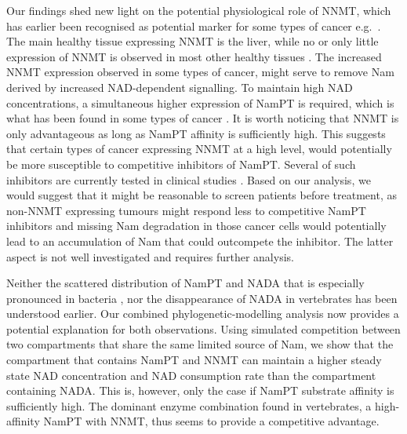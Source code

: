 Our findings shed new light on the potential physiological role of NNMT, which has earlier been recognised as potential marker for some types of cancer e.g.~\cite{Okamura1998}. The main healthy tissue expressing NNMT is the liver, while no or only little expression of NNMT is observed in most other healthy tissues \cite{Aksoy1994}. The increased NNMT expression observed in some types of cancer, might serve to remove Nam derived by increased NAD-dependent signalling. To maintain high NAD concentrations, a simultaneous higher expression of NamPT is required, which is what has been found in some types of cancer \cite{Bi2011,Wang2011}. It is worth noticing that NNMT is only advantageous as long as NamPT affinity is sufficiently high. This suggests that certain types of cancer expressing NNMT at a high level, would potentially be more susceptible to competitive inhibitors of NamPT. Several of such inhibitors are currently tested in clinical studies \cite{EspindolaNetto2017,Xu2015SR}. Based on our analysis, we would suggest that it might be reasonable to screen patients before treatment, as non-NNMT expressing tumours might respond less to competitive NamPT inhibitors and missing Nam degradation in those cancer cells would potentially lead to an accumulation of Nam that could outcompete the inhibitor. The latter aspect is not well investigated and requires further analysis.

Neither the scattered distribution of NamPT and NADA that is especially pronounced in bacteria \cite{Gazzaniga2009}, nor the disappearance of NADA in vertebrates has been understood earlier. Our combined phylogenetic-modelling analysis now provides a potential explanation for both observations. Using simulated competition between two compartments that share the same limited source of Nam, we show that the compartment that contains NamPT and NNMT can maintain a higher steady state NAD concentration and NAD consumption rate than the compartment containing NADA. This is, however, only the case if NamPT substrate affinity is sufficiently high. The dominant enzyme combination found in vertebrates, a high-affinity NamPT with NNMT, thus seems to provide a competitive advantage. 


